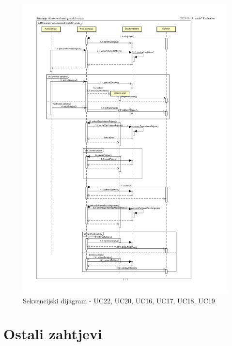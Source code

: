 			\begin{figure}[H]
			\includegraphics[scale=0.7]{slike/gradskisekv.PDF} %
			\centering
			\caption{Sekvencijski dijagram - UC22, UC20, UC16, UC17, UC18, UC19}
		\end{figure}
				\eject
	
		\section{Ostali zahtjevi}
		
